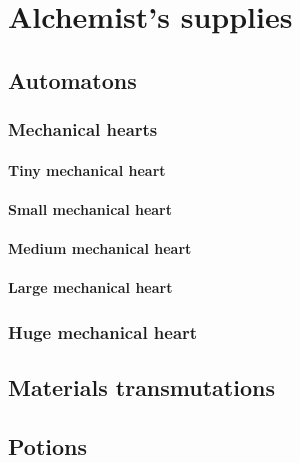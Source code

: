\chapter{Alchemist's supplies}

\section{Automatons}

\subsection{Mechanical hearts}

\subsubsection{Tiny mechanical heart}

\subsubsection{Small mechanical heart}

\subsubsection{Medium mechanical heart}

\subsubsection{Large mechanical heart}

\subsection{Huge mechanical heart}

\section{Materials transmutations}

\section{Potions}